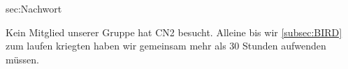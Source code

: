 \documentclass[11pt,titlepage]{article}
\begin{document}
\begingroup
\renewcommand{\section}[2]{}%


\endgroup  

\section{Nachwort}
\label{sec:Nachwort}

Kein Mitglied unserer Gruppe hat CN2 besucht. Alleine bis wir \ref{subsec:BIRD} zum laufen kriegten haben wir gemeinsam mehr als 30 Stunden aufwenden müssen. 
\end{document}
